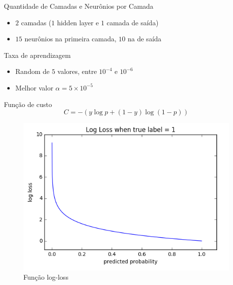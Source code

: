 \documentclass[xcolor=dvipsnames]{beamer}
\begin{document}
        \begin{frame}{Quantidade de Camadas e Neurônios por Camada}
            \begin{itemize}
                \item $2$ camadas ($1$ hidden layer e $1$ camada de saída)
                \item $15$ neurônios na primeira camada, $10$ na de saída
            \end{itemize}
        \end{frame}
    
        \begin{frame}{Taxa de aprendizagem}
            \begin{itemize}
                \item Random de $5$ valores, entre $10^{-4}$ e $10^{-6}$
                \item Melhor valor $\alpha = 5\times 10^{-5}$
            \end{itemize}
        \end{frame}
        \begin{frame}{Função de custo}
            $$C = -(y\log{p} + (1-y)\log{(1-p)})$$
            \begin{figure}
                \centering
                \includegraphics[scale = 0.3]{Imagens/logloss.png}
                \caption{Função log-loss}
                \label{fig:logloss}
            \end{figure}
        \end{frame}
\end{document}
